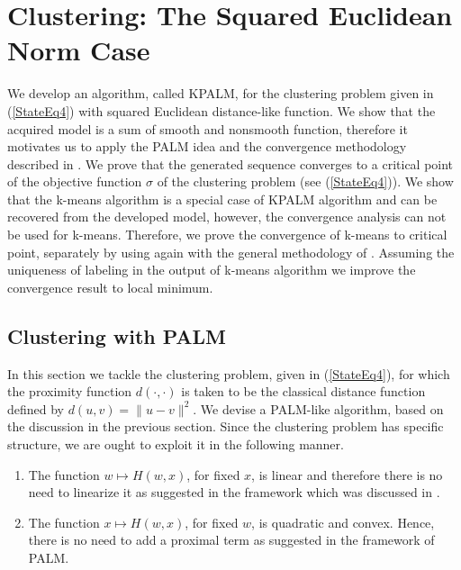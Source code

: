  \chapter{Clustering: The Squared Euclidean Norm Case} \label{Chptr3}

\noindent \noindent \hrulefill

We develop an algorithm, called KPALM, for the clustering problem given in (\ref{StateEq4}) with squared Euclidean distance-like function. We show that the acquired model is a sum of smooth and nonsmooth function, therefore it motivates us to apply the PALM idea and the convergence methodology described in . We prove that the generated sequence converges to a critical point of the objective function $\sigma$ of the clustering problem (see (\ref{StateEq4})). We show that the k-means algorithm is a special case of KPALM algorithm and can be recovered from the developed model, however, the convergence analysis can not be used for k-means. Therefore, we prove the convergence of k-means to critical point, separately by using again with the general methodology of . Assuming the uniqueness of labeling in the output of k-means algorithm we improve the convergence result to local minimum.

\noindent \noindent \hrulefill

\section{Clustering with PALM}\label{State_Clustering_SqNorm}

In this section we tackle the clustering problem, given in (\ref{StateEq4}), for which the proximity function $d(\cdot,\cdot)$ is taken to be the classical distance function defined by $d(u,v) = \|u-v\|^2$. We devise a PALM-like algorithm, based on the discussion in the previous section.
Since the clustering problem has specific structure, we are ought to exploit it in the following manner.
\begin{enumerate}[(1)]
	\item The function $w \mapsto H(w,x)$, for fixed $x$, is linear and therefore there is no need to linearize it as suggested in the framework which was discussed in .
	\item The function $x \mapsto H(w,x)$, for fixed $w$, is quadratic and convex. Hence, there is no need to add a proximal term as suggested in the framework of PALM.
\end{enumerate}

